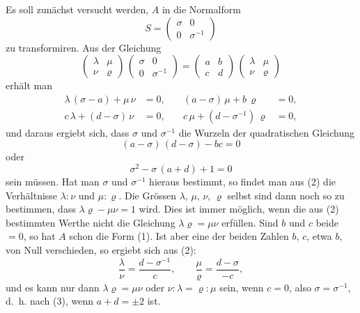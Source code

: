 \documentclass[12pt,a4paper]{article}
\begin{document}
Es soll zunächst versucht werden, $A$ in die Normalform
\begin{equation}\label{eq:68.1}
\tag{1}
S = \begin{pmatrix}\sigma&0\\0&\sigma^{-1}\end{pmatrix}
\end{equation}
zu transformiren. Aus der Gleichung
\[
\begin{pmatrix}\lambda&\mu\\\nu&\varrho\end{pmatrix}\,
\begin{pmatrix}\sigma&0\\0&\sigma^{-1}\end{pmatrix}
= \begin{pmatrix}a&b\\c&d\end{pmatrix}\,
\begin{pmatrix}\lambda&\mu\\\nu&\varrho\end{pmatrix}
\]
erhält man
\begin{equation}\label{eq:68.2}
\tag{2}
\begin{aligned}
\lambda\,(\sigma - a) + \mu\,\nu &= 0, &\quad (a - \sigma)\,\mu + b\,\varrho &= 0,\\
c\,\lambda + (d - \sigma)\,\nu &= 0, &\quad c\,\mu + (d - \sigma^{-1})\,\varrho &= 0,
\end{aligned}
\end{equation}
und daraus ergiebt sich, dass $\sigma$ und $\sigma^{-1}$ die Wurzeln der quadratischen Gleichung
\[
(a - \sigma)\,(d - \sigma) - bc = 0
\]
oder
\begin{equation}\label{eq:68.3}
\tag{3}
\sigma^{2} - \sigma\,(a + d) + 1 = 0
\end{equation}
sein müssen. Hat man $\sigma$ und $\sigma^{-1}$ hieraus bestimmt, so findet man aus (2) die Verhältnisse $\lambda : \nu$ und $\mu : \varrho$. Die Grössen $\lambda$, $\mu$, $\nu$, $\varrho$ selbst sind dann noch so zu bestimmen, dass $\lambda\varrho - \mu\nu = 1$ wird. Dies ist immer möglich, wenn die aus (2) bestimmten Werthe nicht die Gleichung $\lambda\varrho = \mu\nu$ erfüllen. Sind $b$ und $c$ beide $= 0$, so hat $A$ schon die Form (1). Ist aber eine der beiden Zahlen $b$, $c$, etwa $b$, von Null verschieden, so ergiebt sich aus (2):
\begin{equation}\label{eq:68.4}
\tag{4}
\frac{\lambda}{\nu} = \frac{d - \sigma^{-1}}{c},\qquad
\frac{\mu}{\varrho} = \frac{d - \sigma}{-c},
\end{equation}
und es kann nur dann $\lambda\varrho = \mu\nu$ oder $\nu : \lambda = \varrho : \mu$ sein, wenn $c = 0$, also $\sigma = \sigma^{-1}$, d.~h. nach (3), wenn $a + d = \pm 2$ ist.
\end{document}
